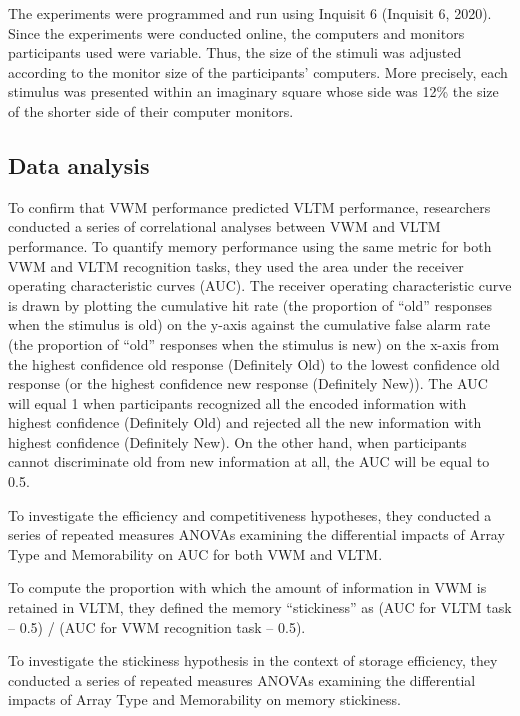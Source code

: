 \documentclass[
  man]{apa6}
\begin{document}
The experiments were programmed and run using Inquisit 6 (Inquisit 6, 2020). Since the experiments were conducted online, the computers and monitors participants used were variable. Thus, the size of the stimuli was adjusted according to the monitor size of the participants' computers. More precisely, each stimulus was presented within an imaginary square whose side was 12\% the size of the shorter side of their computer monitors.

\hypertarget{data-analysis}{%
\subsection{Data analysis}\label{data-analysis}}

To confirm that VWM performance predicted VLTM performance, researchers conducted a series of correlational analyses between VWM and VLTM performance. To quantify memory performance using the same metric for both VWM and VLTM recognition tasks, they used the area under the receiver operating characteristic curves (AUC). The receiver operating characteristic curve is drawn by plotting the cumulative hit rate (the proportion of ``old'' responses when the stimulus is old) on the y-axis against the cumulative false alarm rate (the proportion of ``old'' responses when the stimulus is new) on the x-axis from the highest confidence old response (Definitely Old) to the lowest confidence old response (or the highest confidence new response (Definitely New)). The AUC will equal 1 when participants recognized all the encoded information with highest confidence (Definitely Old) and rejected all the new information with highest confidence (Definitely New). On the other hand, when participants cannot discriminate old from new information at all, the AUC will be equal to 0.5.

To investigate the efficiency and competitiveness hypotheses, they conducted a series of repeated measures ANOVAs examining the differential impacts of Array Type and Memorability on AUC for both VWM and VLTM.

To compute the proportion with which the amount of information in VWM is retained in VLTM, they defined the memory ``stickiness'' as (AUC for VLTM task -- 0.5) / (AUC for VWM recognition task -- 0.5).

To investigate the stickiness hypothesis in the context of storage efficiency, they conducted a series of repeated measures ANOVAs examining the differential impacts of Array Type and Memorability on memory stickiness.
\end{document}
